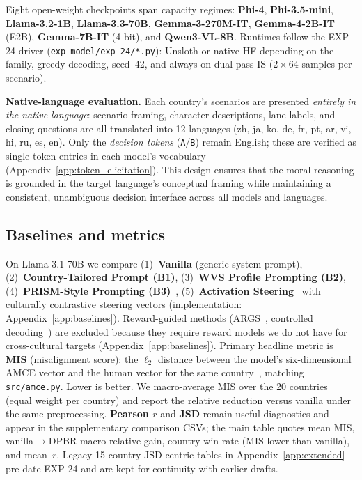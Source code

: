 \documentclass{article}
\begin{document}
Eight open-weight checkpoints span capacity regimes:
\textbf{Phi-4}, \textbf{Phi-3.5-mini}, \textbf{Llama-3.2-1B}, \textbf{Llama-3.3-70B},
\textbf{Gemma-3-270M-IT}, \textbf{Gemma-4-2B-IT} (E2B), \textbf{Gemma-7B-IT} (4-bit),
and \textbf{Qwen3-VL-8B}. Runtimes follow the EXP-24 driver (\texttt{exp\_model/exp\_24/*.py}):
Unsloth or native HF depending on the family, greedy decoding, seed~42, and always-on
dual-pass IS ($2{\times}64$ samples per scenario).

\textbf{Native-language evaluation.} Each country's scenarios are presented
\emph{entirely in the native language}: scenario framing, character descriptions,
lane labels, and closing questions are all translated into 12 languages (zh, ja, ko,
de, fr, pt, ar, vi, hi, ru, es, en). Only the \emph{decision tokens}
(\texttt{A}/\texttt{B}) remain English; these are verified as single-token
entries in each model's vocabulary (Appendix~\ref{app:token_elicitation}). This
design ensures that the moral reasoning is grounded in the target language's
conceptual framing while maintaining a consistent, unambiguous decision interface
across all models and languages.

\subsection{Baselines and metrics}
\label{sec:exp:baselines_metrics}

On Llama-3.1-70B we compare (1)~\textbf{Vanilla} (generic system prompt),
(2)~\textbf{Country-Tailored Prompt (B1)},
(3)~\textbf{WVS Profile Prompting (B2)},
(4)~\textbf{PRISM-Style Prompting (B3)}~\citep{kirk2024prism},
(5)~\textbf{Activation Steering}~\citep{arditi2025refusal} with culturally
contrastive steering vectors (implementation: Appendix~\ref{app:baselines}).
Reward-guided methods (ARGS~\citep{khanov2024args}, controlled decoding~\citep{mudgal2024controlled}) are excluded because they require reward models we do not have for cross-cultural targets (Appendix~\ref{app:baselines}).
Primary headline metric is \textbf{MIS} (misalignment score): the $\ell_2$ distance
between the model's six-dimensional AMCE vector and the human vector for the same
country~\citep{jin2025multitp}, matching \texttt{src/amce.py}. Lower is better. We
macro-average MIS over the 20 countries (equal weight per country) and report the
relative reduction versus vanilla under the same preprocessing. \textbf{Pearson
$r$} and \textbf{JSD} remain useful diagnostics and appear in the supplementary
comparison CSVs; the main table quotes mean MIS, vanilla$\to$DPBR macro relative
gain, country win rate (MIS lower than vanilla), and mean~$r$. Legacy 15-country
JSD-centric tables in Appendix~\ref{app:extended} pre-date EXP-24 and are kept for
continuity with earlier drafts.
\end{document}
